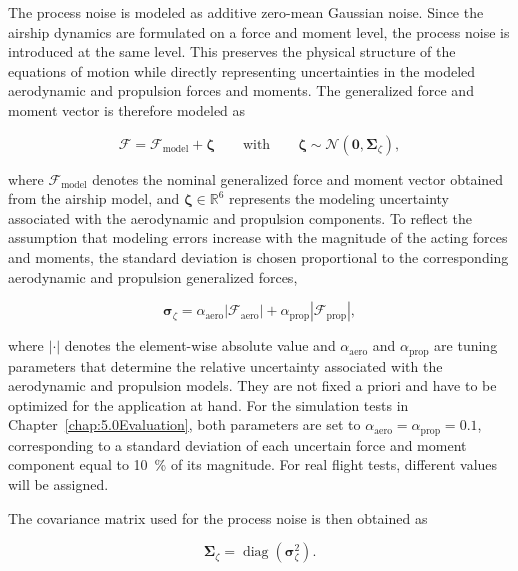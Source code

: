 The process noise is modeled as additive zero-mean Gaussian noise.
Since the airship dynamics are formulated on a force and moment level, the process noise is introduced at the same level. This preserves the physical structure of the equations of motion while directly representing uncertainties in the modeled aerodynamic and propulsion forces and moments. The generalized force and moment vector is therefore modeled as

\begin{equation}
	\bm{\mathcal{F}}
	=
	\bm{\mathcal{F}}_{\mathrm{model}}
	+
	\bm{\zeta} 
	\qquad
	\text{with}
	\qquad
	\bm{\zeta}
	\sim
	\mathcal{N}
	\left(
	\bm{0},
	\bm{\Sigma}_{\zeta}
	\right),
\end{equation}

where $\bm{\mathcal{F}}_{\mathrm{model}}$ denotes the nominal generalized force and moment vector obtained from the airship model, and $\bm{\zeta} \in \mathbb{R}^6$ represents the modeling uncertainty associated with the aerodynamic and propulsion components.
To reflect the assumption that modeling errors increase with the magnitude of the acting forces and moments, the standard deviation is chosen proportional to the corresponding aerodynamic and propulsion generalized forces,

\begin{equation}
	\bm{\sigma}_{\zeta}
	=
	\alpha_{\mathrm{aero}}
	\left|
	\bm{\mathcal{F}}_{\mathrm{aero}}
	\right|
	+
	\alpha_{\mathrm{prop}}
	\left|
	\bm{\mathcal{F}}_{\mathrm{prop}}
	\right|,
\end{equation}

where $\left|\cdot\right|$ denotes the element-wise absolute value and $\alpha_{\mathrm{aero}}$ and $\alpha_{\mathrm{prop}}$ are tuning parameters that determine the relative uncertainty associated with the aerodynamic and propulsion models. They are not fixed a priori and have to be optimized for the application at hand. For the simulation tests in Chapter~\ref{chap:5.0Evaluation}, both parameters are set to $\alpha_{\mathrm{aero}} = \alpha_{\mathrm{prop}} = 0.1$, corresponding to a standard deviation of each uncertain force and moment component equal to \SI{10}{\percent} of its magnitude. For real flight tests, different values will be assigned.

The covariance matrix used for the process noise is then obtained as

\begin{equation}
	\bm{\Sigma}_{\zeta}
	=
	\operatorname{diag}
	\left(
	\bm{\sigma}_{\zeta}^2
	\right).
\end{equation}

